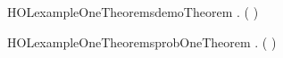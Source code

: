 \newcommand{\HOLexampleOneDate}{06 October 2017}
\newcommand{\HOLexampleOneTime}{20:24}
\begin{SaveVerbatim}{HOLexampleOneTheoremsdemoTheorem}
\HOLTokenTurnstile{} \HOLSymConst{\HOLTokenForall{}} .  \HOLSymConst{\HOLTokenImp{}} ( \HOLSymConst{\HOLTokenImp{}} ) \HOLSymConst{\HOLTokenImp{}} 
\end{SaveVerbatim}
\newcommand{\HOLexampleOneTheoremsdemoTheorem}{\UseVerbatim{HOLexampleOneTheoremsdemoTheorem}}
\begin{SaveVerbatim}{HOLexampleOneTheoremsprobOneTheorem}
\HOLTokenTurnstile{} \HOLSymConst{\HOLTokenForall{}} .  \HOLSymConst{\HOLTokenImp{}} ( \HOLSymConst{\HOLTokenImp{}} ) \HOLSymConst{\HOLTokenImp{}} 
\end{SaveVerbatim}
\newcommand{\HOLexampleOneTheoremsprobOneTheorem}{\UseVerbatim{HOLexampleOneTheoremsprobOneTheorem}}
\newcommand{\HOLexampleOneTheorems}{
\HOLThmTag{example1}{demoTheorem}\HOLexampleOneTheoremsdemoTheorem
\HOLThmTag{example1}{prob1Theorem}\HOLexampleOneTheoremsprobOneTheorem
}
